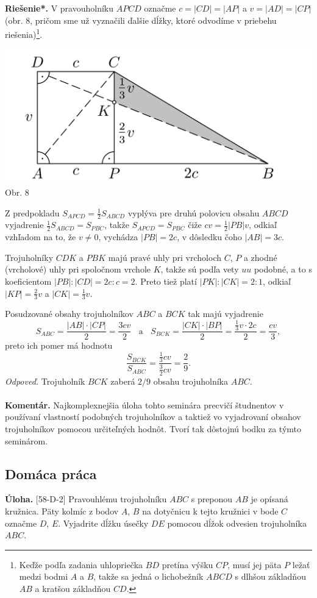 \documentclass[11pt,a4paper,oneside,final]{book}
\newcommand{\kom}{\textbf{Komentár.} }
\newcommand{\ul}{\textbf{Úloha.} }
\newcommand{\rieh}{\textbf{Riešenie*.} }
\begin{document}
\rieh V pravouholníku $APCD$ označme $c = |CD| = |AP|$ a $v = |AD| = |CP|$ (obr. 8, pričom sme už vyznačili ďalšie dĺžky, ktoré odvodíme v priebehu riešenia)\footnote{Keďže podľa zadania uhlopriečka $BD$ pretína výšku $CP$, musí jej päta $P$ ležať medzi bodmi $A$ a $B$, takže sa jedná o  lichobežník $ABCD$ s dlhšou základňou $AB$ a kratšou základňou $CD$.}.
\begin{center}
\includegraphics{65K3}\\

Obr. 8
\end{center}
Z predpokladu $S_{APCD} =\frac{1}{2}S_{ABCD}$ vyplýva pre druhú polovicu obsahu $ABCD$ vyjadrenie $\frac{1}{2}S_{ABCD} = S_{PBC}$, takže $S_{APCD} = S_{PBC}$ čiže $cv =\frac{1}{2}|PB|v$, odkiaľ vzhľadom na to, že $v \neq 0$, vychádza $|PB| = 2c$, v dôsledku čoho $|AB| = 3c$.

Trojuholníky $CDK$ a $PBK$ majú pravé uhly pri vrcholoch $C$, $P$ a zhodné (vrcholové) uhly pri spoločnom vrchole $K$, takže sú podľa vety $uu$ podobné, a to s koeficientom $|PB| : |CD| = 2c : c = 2$. Preto tiež platí $|PK| : |CK| = 2 : 1$, odkiaľ $|KP| =\frac{2}{3}v$ a $|CK| =\frac{1}{3}v$.

Posudzované obsahy trojuholníkov $ABC$ a $BCK$ tak majú vyjadrenie
$$S_{ABC} = \frac{|AB| \cdot |CP|}{2}=\frac{3cv}{2} \ \ \ \ \text{a} \ \ \ \  S_{BCK} =\frac{|CK|\cdot |BP|}{2}=\frac{\frac{1}{3}v\cdot 2c}{2}=\frac{cv}{3},$$
preto ich pomer má hodnotu
$$\frac{S_{BCK}}{S_{ABC}}=\frac{\frac{1}{3}cv}{\frac{3}{2}cv}=\frac{2}{9}.$$
\textit{Odpoveď.} Trojuholník $BCK$ zaberá $2/9$ obsahu trojuholníka $ABC$.\\
\\
\kom Najkomplexnejšia úloha tohto seminára precvičí študnentov v používaní vlastností podobných trojuholníkov a taktiež vo vyjadrovaní obsahov trojuholníkov pomocou určiteľných hodnôt. Tvorí tak dôstojnú bodku za týmto seminárom.

\subsection*{Domáca práca}
\begin{tcolorbox}[breakable,notitle,boxrule=0pt,colback=light-gray,colframe=light-gray]\ul [58-D-2] Pravouhlému trojuholníku $ABC$ s preponou $AB$ je opísaná kružnica. Päty kolmíc z bodov $A$, $B$ na dotyčnicu k tejto kružnici v bode $C$ označme $D$, $E$. Vyjadrite dĺžku úsečky $DE$ pomocou dĺžok odvesien trojuholníka $ABC$.

\end{tcolorbox}
\end{document}
